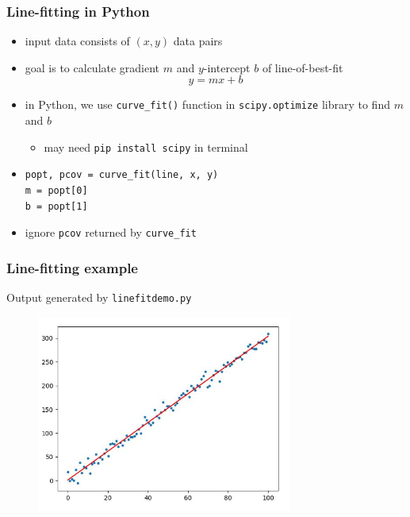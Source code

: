 \documentclass[english,14pt]{beamer}
\begin{document}

\begin{frame}[fragile]

\frametitle{Line-fitting in Python}

\begin{itemize}
	\item input data consists of $(x,y)$ data pairs
	\item goal is to calculate gradient $m$ and $y$-intercept $b$ of line-of-best-fit
	\[
		y = mx + b
	\]
	\item in Python, we use \texttt{curve\_fit()} function in \texttt{scipy.optimize} library to find $m$ and $b$
	\begin{itemize}
		\item may need \texttt{pip install scipy} in terminal
	\end{itemize}
	\item[] \begin{lstlisting}[style=CStyle,basicstyle=\small]
popt, pcov = curve_fit(line, x, y)
m = popt[0]
b = popt[1]
\end{lstlisting}
	\item ignore \texttt{pcov} returned by \texttt{curve\_fit}
\end{itemize}



\end{frame}


\begin{frame}[fragile]

\frametitle{Line-fitting example}

Output generated by \texttt{linefitdemo.py}
\vspace*{-2mm}
\begin{figure}[ht]
	\centering
	\includegraphics[width=0.75\textwidth]{figures/linefitdemoOutput}
\end{figure}

\end{frame}
\end{document}

